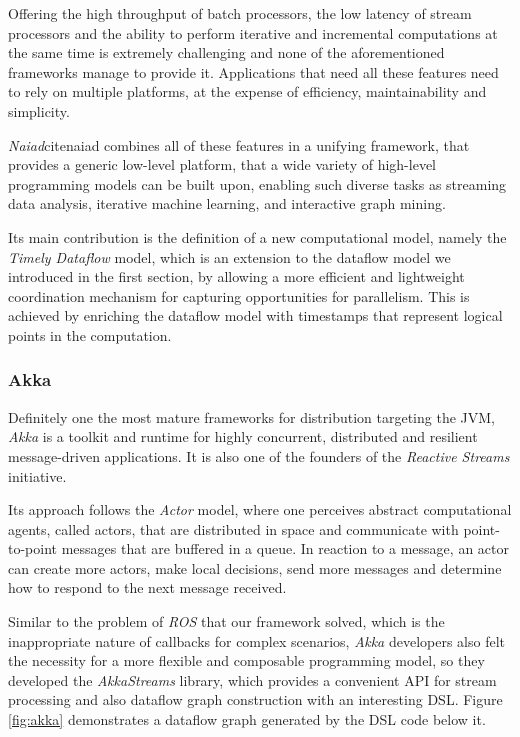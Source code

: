 \documentclass[sigplan,review,anonymous]{acmart}
\begin{document}
Offering the high throughput of batch processors, the low latency of stream
processors and the ability to perform iterative and incremental computations at
the same time is extremely challenging and none of the aforementioned frameworks
manage to provide it. Applications that need all these features need to rely on
multiple platforms, at the expense of efficiency, maintainability and
simplicity.

\textit{Naiad}cite{naiad} combines all of these features in a unifying
framework, that provides a generic low-level platform, that a wide variety of
high-level programming models can be built upon, enabling such diverse tasks as
streaming data analysis, iterative machine learning, and interactive graph
mining.

Its main contribution is the definition of a new computational model, namely the
\textit{Timely Dataflow} model, which is an extension to the dataflow model we
introduced in the first section, by allowing a more efficient and lightweight
coordination mechanism for capturing opportunities for parallelism. This is
achieved by enriching the dataflow model with timestamps that represent logical
points in the computation.

\subsubsection{Akka}

Definitely one the most mature frameworks for distribution targeting the JVM,
\textit{Akka} is a toolkit and runtime for highly
concurrent, distributed and resilient message-driven applications. It is also
one of the founders of the \textit{Reactive Streams}\cite{rss} initiative.

Its approach follows the \textit{Actor} model\cite{actor}, where one perceives
abstract computational agents, called actors, that are distributed in space and
communicate with point-to-point messages that are buffered in a queue. In
reaction to a message, an actor can create more actors, make local decisions,
send more messages and determine how to respond to the next message received.

Similar to the problem of \textit{ROS} that our framework solved, which is the
inappropriate nature of callbacks for complex scenarios, \textit{Akka}
developers also felt the necessity for a more flexible and composable
programming model, so they developed the \textit{AkkaStreams} library, which
provides a convenient API for stream processing and also dataflow graph
construction with an interesting DSL. Figure \ref{fig:akka} demonstrates a
dataflow graph generated by the DSL code below it.
\end{document}
